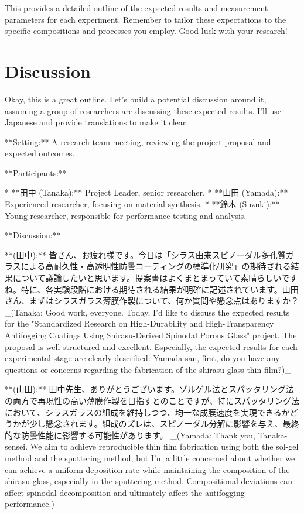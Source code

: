 \documentclass{article}
\begin{document}
This provides a detailed outline of the expected results and measurement parameters for each experiment. Remember to tailor these expectations to the specific compositions and processes you employ. Good luck with your research!


\section{Discussion}
Okay, this is a great outline. Let's build a potential discussion around it, assuming a group of researchers are discussing these expected results. I'll use Japanese and provide translations to make it clear.

**Setting:** A research team meeting, reviewing the project proposal and expected outcomes.

**Participants:**

*   **田中 (Tanaka):** Project Leader, senior researcher.
*   **山田 (Yamada):** Experienced researcher, focusing on material synthesis.
*   **鈴木 (Suzuki):** Young researcher, responsible for performance testing and analysis.

**Discussion:**

**(田中):** 皆さん、お疲れ様です。今日は「シラス由来スピノーダル多孔質ガラスによる高耐久性・高透明性防曇コーティングの標準化研究」の期待される結果について議論したいと思います。提案書はよくまとまっていて素晴らしいですね。特に、各実験段階における期待される結果が明確に記述されています。山田さん、まずはシラスガラス薄膜作製について、何か質問や懸念点はありますか？
_(Tanaka: Good work, everyone. Today, I'd like to discuss the expected results for the "Standardized Research on High-Durability and High-Transparency Antifogging Coatings Using Shirasu-Derived Spinodal Porous Glass" project. The proposal is well-structured and excellent. Especially, the expected results for each experimental stage are clearly described. Yamada-san, first, do you have any questions or concerns regarding the fabrication of the shirasu glass thin film?)_

**(山田):** 田中先生、ありがとうございます。ゾルゲル法とスパッタリング法の両方で再現性の高い薄膜作製を目指すとのことですが、特にスパッタリング法において、シラスガラスの組成を維持しつつ、均一な成膜速度を実現できるかどうかが少し懸念されます。組成のズレは、スピノーダル分解に影響を与え、最終的な防曇性能に影響する可能性があります。
_(Yamada: Thank you, Tanaka-sensei. We aim to achieve reproducible thin film fabrication using both the sol-gel method and the sputtering method, but I'm a little concerned about whether we can achieve a uniform deposition rate while maintaining the composition of the shirasu glass, especially in the sputtering method. Compositional deviations can affect spinodal decomposition and ultimately affect the antifogging performance.)_
\end{document}
